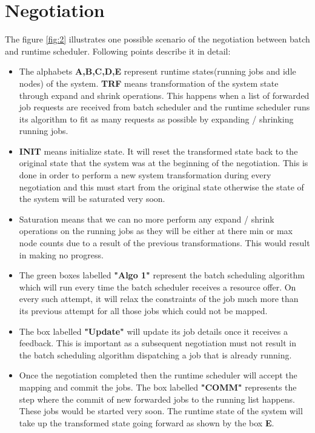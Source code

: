 \section{Negotiation}
The figure \ref{fig:2} illustrates one possible scenario of the negotiation between batch and runtime scheduler. Following points describe it in detail:
\begin{itemize}
\item The alphabets \textbf{A,B,C,D,E} represent runtime states(running jobs and idle nodes) of the system. \textbf{TRF} means transformation of the system state through expand and shrink operations. This happens when a list of forwarded job requests are received from batch scheduler and the runtime scheduler runs its algorithm to fit as many requests as possible by expanding / shrinking running jobs.
\item \textbf{INIT} means initialize state. It will reset the transformed state back to the original state that the system was at the beginning of the negotiation. This is done in order to perform a new system transformation during every negotiation and this must start from the original state otherwise the state of the system will be saturated very soon.
\item Saturation means that we can no more perform any expand / shrink operations on the running jobs as they will be either at there min or max node counts due to a result of the previous transformations. This would result in making no progress.
\item The green boxes labelled \textbf{"Algo 1"} represent the batch scheduling algorithm which will run every time the batch scheduler receives a resource offer. On every such attempt, it will relax the constraints of the job much more than its previous attempt for all those jobs which could not be mapped.
\item The box labelled \textbf{"Update"} will update its job details once it receives a feedback. This is important as a subsequent negotiation must not result in the batch scheduling algorithm dispatching a job that is already running.
\item Once the negotiation completed then the runtime scheduler will accept the mapping and commit the jobs. The box labelled \textbf{"COMM"} represents the step where the commit of new forwarded jobs to the running list happens. These jobs would be started very soon. The runtime state of the system will take up the transformed state going forward as shown by the box \textbf{E}.
\end{itemize}

